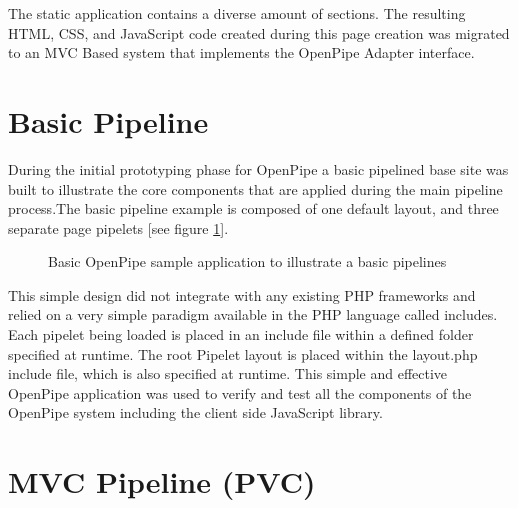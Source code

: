 \documentclass[12pt]{report}
\begin{document}
The static application contains a diverse amount of sections. The resulting HTML, CSS, and JavaScript code created during this page creation was migrated to an MVC Based system that implements the OpenPipe Adapter interface.


\section{Basic Pipeline}

During the initial prototyping phase for OpenPipe a basic pipelined base site was built to illustrate the core components that are applied during the main pipeline process.The basic pipeline example is composed of one default layout, and three separate page pipelets [see figure \ref{fig:basicPipeline}]. 

\begin{figure}[H]
\label{fig:basicPipeline}
\centering
{}
\caption{Basic OpenPipe sample application to illustrate a basic pipelines}
\end{figure}

This simple design did not integrate with any existing PHP frameworks and relied on a very simple paradigm available in the PHP language called includes. Each pipelet being loaded is placed in an include file within a defined folder specified at runtime. The root Pipelet layout is placed within the layout.php include file,	 which is also specified at runtime. This simple and effective OpenPipe application was used to verify and test all the components of the OpenPipe system including the client side JavaScript library. 


\section{MVC Pipeline (PVC)}
\end{document}
